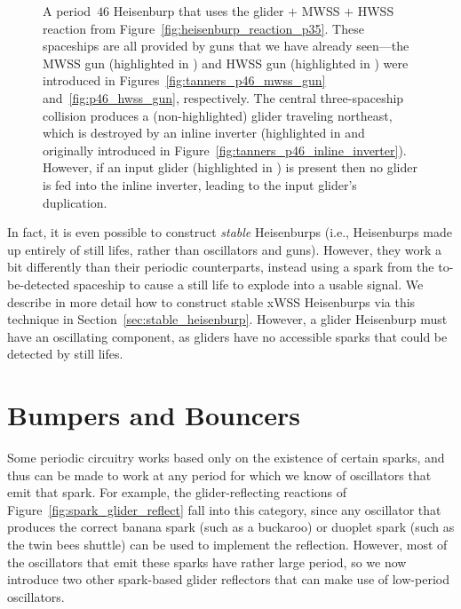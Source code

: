 \begin{figure}[!htb]
	\centering
	\caption{A period~$46$ Heisenburp that uses the glider $+$ MWSS $+$ HWSS reaction from Figure~\ref{fig:heisenburp_reaction_p35}. These spaceships are all provided by guns that we have already seen---the MWSS gun (highlighted in ) and HWSS gun (highlighted in ) were introduced in Figures~\ref{fig:tanners_p46_mwss_gun} and~\ref{fig:p46_hwss_gun}, respectively. The central three-spaceship collision produces a (non-highlighted) glider traveling northeast, which is destroyed by an inline inverter (highlighted in  and originally introduced in Figure~\ref{fig:tanners_p46_inline_inverter}). However, if an input glider (highlighted in ) is present then no glider is fed into the inline inverter, leading to the input glider's duplication.}\label{fig:p46_heisenburp_constructed}
\end{figure}

In fact, it is even possible to construct \emph{stable} Heisenburps (i.e., Heisenburps made up entirely of still lifes, rather than oscillators and guns). However, they work a bit differently than their periodic counterparts, instead using a spark from the to-be-detected spaceship to cause a still life to explode into a usable signal. We describe in more detail how to construct stable xWSS Heisenburps via this technique in Section~\ref{sec:stable_heisenburp}. However, a glider Heisenburp must have an oscillating component, as gliders have no accessible sparks that could be detected by still lifes.


\section{Bumpers and Bouncers}\label{sec:bumper_bouncer}

Some periodic circuitry works based only on the existence of certain sparks, and thus can be made to work at any period for which we know of oscillators that emit that spark. For example, the glider-reflecting reactions of Figure~\ref{fig:spark_glider_reflect} fall into this category, since any oscillator that produces the correct banana spark (such as a buckaroo) or duoplet spark (such as the twin bees shuttle) can be used to implement the reflection. However, most of the oscillators that emit these sparks have rather large period, so we now introduce two other spark-based glider reflectors that can make use of low-period oscillators.

